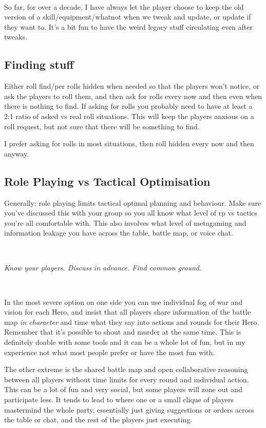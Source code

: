 \

So far, for over a decade, I have always let the player choose to keep the old version of a skill/equipment/whatnot when we tweak and update, or update if they want to.
It's a bit fun to have the weird legacy stuff circulating even after tweaks.


\subsection*{Finding stuff}
Either roll find/per rolls hidden when needed so that the players won't notice, or ask the players to roll them, and then ask for rolls every now and then even when there is nothing to find. If asking for rolls you probably need to have at least a 2:1 ratio of asked vs real roll situations. This will keep the players anxious on a roll request, but not sure that there will be something to find.

I prefer asking for rolls in most situations, then roll hidden every now and then anyway.


\subsection*{Role Playing vs Tactical Optimisation}
Generally: role playing limits tactical optimal planning and behaviour. Make sure you've discussed this with your group so you all know what level of rp vs tactics you're all comfortable with. This also involves what level of metagaming and information leakage you have across the table, battle map, or voice chat.

\

\noindent \emph{Know your players. Discuss in advance. Find common ground.}

\

In the most severe option on one side you can use individual fog of war and vision for each Hero, and insist that all players share information of the battle map \emph{in character} and time what they say into actions and rounds for their Hero. Remember that it's possible to shout and murder at the same time. This is definitely doable with some tools and it can be a whole lot of fun, but in my experience not what most people prefer or have the most fun with.

The other extreme is the shared battle map and open collaborative reasoning between all players without time limits for every round and individual action. This can be a lot of fun and very social, but some players will zone out and participate less. It tends to lead to where one or a small clique of players mastermind the whole party, essentially just giving suggestions or orders across the table or chat, and the rest of the players just executing.


